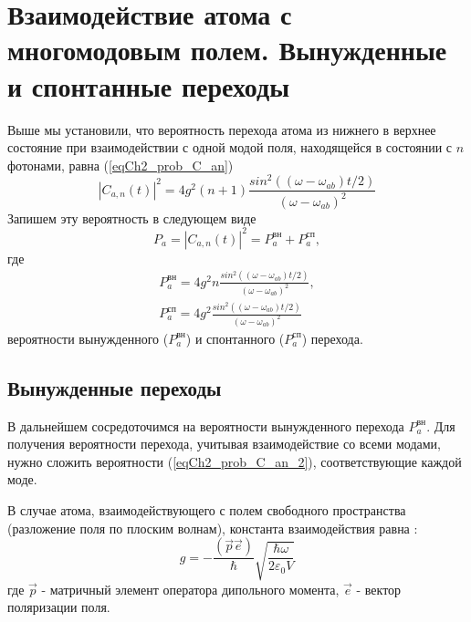 \section{Взаимодействие атома с многомодовым полем. Вынужденные и
  спонтанные переходы}
Выше мы установили, что вероятность перехода атома из нижнего в
верхнее состояние при взаимодействии с одной модой поля, находящейся в
состоянии с $n$ фотонами, равна (\ref{eqCh2_prob_C_an}) 
\begin{equation}
\left|C_{a,n}\left(t\right)\right|^2 = 4 g^2 \left(n+1\right)
  \frac{sin^2\left(\left(\omega - 
  \omega_{ab}\right)t/2\right)} {\left(\omega - 
  \omega_{ab}\right)^2}
  \nonumber
\end{equation}
Запишем эту вероятность в следующем виде
\begin{equation}
  P_a = \left|C_{a,n}\left(t\right)\right|^2 =
  P_a^{\mbox{вн}} + P_a^{\mbox{сп}},
  \label{eqCh2_prob_C_an_2_1}
\end{equation}
где
\begin{eqnarray}
  P_a^{\mbox{вн}} = 4 g^2 n
  \frac{sin^2\left(\left(\omega - 
  \omega_{ab}\right)t/2\right)} {\left(\omega - 
    \omega_{ab}\right)^2},
  \nonumber \\
  P_a^{\mbox{сп}} = 4 g^2 
  \frac{sin^2\left(\left(\omega - 
  \omega_{ab}\right)t/2\right)} {\left(\omega - 
  \omega_{ab}\right)^2}
  \label{eqCh2_prob_C_an_2}
\end{eqnarray}
вероятности вынужденного ($P_a^{\mbox{вн}}$)
и спонтанного ($P_a^{\mbox{сп}}$) перехода.

\subsection{Вынужденные переходы}
В дальнейшем сосредоточимся на вероятности вынужденного перехода
$P_a^{\mbox{вн}}$.
Для получения вероятности перехода, учитывая взаимодействие со всеми
модами, нужно сложить вероятности (\ref{eqCh2_prob_C_an_2}),
соответствующие каждой моде. 

В случае атома, взаимодействующего с полем свободного пространства
(разложение поля по плоским волнам), константа взаимодействия равна
\cite{bLuisell1972}: 
\begin{equation}
g = - \frac{\left(\vec{p}\vec{e}\right)}{\hbar}
\sqrt{\frac{\hbar \omega}{2 \varepsilon_0 V}}
\end{equation}
где $\vec{p}$ - матричный элемент оператора дипольного момента,
$\vec{e}$ - вектор поляризации поля. 


